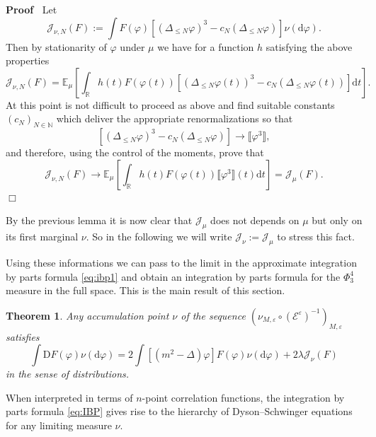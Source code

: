 \documentclass[a4paper,11pt]{article}
\newcommand{\assign}{:=}
\newcommand{\mathD}{\mathrm{D}}
\newcommand{\mathd}{\mathrm{d}}
\newenvironment{proof}{\noindent\textbf{Proof\ }}{\hspace*{\fill}$\Box$\medskip}
\newtheorem{theorem}{Theorem}[section]
\numberwithin{equation}{section}
\begin{document}
\begin{proof}
  Let
  \[ \mathcal{J}_{\nu, N} (F) \assign \int F (\varphi) [(\Delta_{\leqslant N}
     \varphi)^3 - c_N (\Delta_{\leqslant N} \varphi)] \nu (\mathd \varphi) .
  \]
  Then by stationarity of $\varphi$ under $\mu$ we have for a function $h$
  satisfying the above properties
  \[ \mathcal{J}_{\nu, N} (F) =\mathbb{E}_{\mu} \left[ \int_{\mathbb{R}} h (t)
     F (\varphi (t)) [(\Delta_{\leqslant N} \varphi (t))^3 - c_N
     (\Delta_{\leqslant N} \varphi (t))] \mathd t \right] . \]
  At this point is not difficult to proceed as above and find suitable
  constants $(c_N)_{N \in \mathbb{N}}$ which deliver the appropriate
  renormalizations so that
  \[ [(\Delta_{\leqslant N} \varphi)^3 - c_N (\Delta_{\leqslant N} \varphi)]
     \rightarrow \llbracket \varphi^3 \rrbracket, \]
  and therefore, using the control of the moments, prove that
  \[ \mathcal{J}_{\nu, N} (F) \rightarrow \mathbb{E}_{\mu} \left[
     \int_{\mathbb{R}} h (t) F (\varphi (t)) \llbracket \varphi^3 \rrbracket
     (t) \mathd t \right] =\mathcal{J}_{\mu} (F) . \]
\end{proof}

\begin{remark}
  By the previous lemma it is now clear that $\mathcal{J}_{\mu}$ does not
  depends on $\mu$ but only on its first marginal $\nu$. So in the following
  we will write $\mathcal{J}_{\nu} \assign \mathcal{J}_{\mu}$ to stress this
  fact.
\end{remark}



Using these informations we can pass to the limit in the approximate
integration by parts formula {\eqref{eq:ibp1}} and obtain an integration by
parts formula for the $\Phi^4_3$ measure in the full space. This is the main
result of this section.

\begin{theorem}
  \label{thm:ibp}Any accumulation point $\nu$ of the sequence $(\nu_{M,
  \varepsilon} \circ (\mathcal{E}^{\varepsilon})^{- 1})_{M, \varepsilon}$
  satisfies
  \begin{equation}
    \int \mathD F (\varphi) \nu (\mathd \varphi) = 2 \int [(m^2 - \Delta)
    \varphi] F (\varphi) \nu (\mathd \varphi) + 2\lambda \mathcal{J}_{\nu} (F)
    \label{eq:IBP}
  \end{equation}
  in the sense of distributions.
\end{theorem}

When interpreted in terms of $n$-point correlation functions, the integration
by parts formula {\eqref{eq:IBP}} gives rise to the hierarchy of
Dyson--Schwinger equations for any limiting measure $\nu$.
\end{document}

